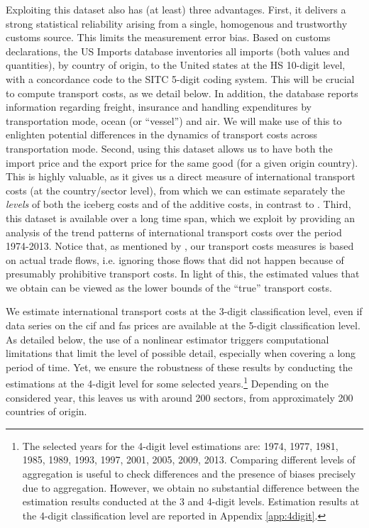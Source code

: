 \documentclass[a4paper,11pt]{article}
\begin{document}
Exploiting this dataset also has (at least) three advantages. First, it delivers a strong statistical reliability arising from a single, homogenous and trustworthy customs source.  This limits the measurement error bias. Based on customs declarations, the US Imports database inventories all imports (both values and quantities), by country of origin, to the United states at the HS 10-digit level, with a concordance code to the SITC 5-digit coding system. This will be crucial to compute transport costs, as we detail below. In addition, the database reports information regarding freight, insurance and handling expenditures by transportation mode, ocean (or ``vessel'') and air. We will make use of this to enlighten potential differences in the dynamics of transport costs across transportation mode. Second, using this dataset allows us to have both the import price and the export price for the same good (for a given origin country). This is highly valuable, as it gives us a direct measure of international transport costs (at the country/sector level), from which we can estimate separately the \textit{levels} of both the iceberg costs and of the additive costs, in contrast to \cite{Irrazabal_2015}. Third, this dataset is available over a long time span, which we exploit by providing an analysis of the trend patterns of international transport costs over the period 1974-2013. Notice that, as mentioned by \cite{Lafourcade_Thisse}, our transport costs measures is based on actual trade flows, i.e. ignoring those flows that did not happen because of presumably prohibitive transport costs. In light of this, the estimated values that we obtain can be viewed as the lower bounds of the ``true'' transport costs.\smallskip


We estimate international transport costs at the 3-digit classification level, even if data series on the cif and fas prices are available at the 5-digit classification level. As detailed below, the use of a nonlinear estimator triggers computational limitations that limit the level of possible detail, especially when covering a long period of time. Yet, we ensure the robustness of these results by conducting the estimations at the 4-digit level for some selected years.\footnote{The selected years for the 4-digit level estimations are: 1974, 1977, 1981, 1985, 1989, 1993, 1997, 2001, 2005, 2009, 2013. Comparing different levels of aggregation is useful to check differences and the presence of biases precisely due to aggregation. However, we obtain no substantial difference between the estimation results conducted at the 3 and 4-digit levels. Estimation results at the 4-digit classification level are reported in Appendix \ref{app:4digit}.} Depending on the considered year, this leaves us with around 200 sectors, from approximately 200 countries of origin.
\end{document}
